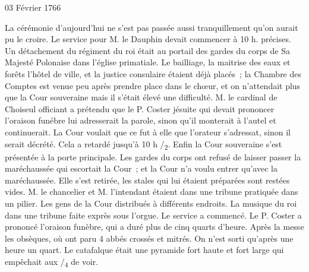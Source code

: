                     \begin{diary}{03 Février 1766}{}
                        
                         La cérémonie d'aujourd'hui ne s'est
                           pas
                           passée aussi tranquillement qu'on aurait pu
                           le croire. Le service pour M.
                              le Dauphin
                           devait commencer à 10 h. précises. Un
                           détachement du régiment du
                              roi était au portail
                           des gardes du corps de Sa Majesté Polonaise dans l’église
                              primatiale. Le
                              bailliage, la maitrise
                              des eaux et forêts
                           l'hôtel de ville, et la justice
                           consulaire étaient
                           déjà placés ; la Chambre des
                              Comptes est
                           venue peu après prendre place dans le
                           chœur, et on n'attendait plus que la Cour
                              souveraine mais il s'était élevé une difficulté.
                           M. le cardinal de Choiseul
                           officiant a prétendu
                           que le P. Coster
                           jésuite qui devait prononcer
                           l'oraison funébre lui adresserait la parole,
                           sinon qu'il monterait à l'autel et continuerait.
                           La Cour voulait que ce fut à elle que l'orateur
                           s'adressat, sinon il serait décrété. Cela
                           a retardé jusqu'à 10 h /\textsubscript{2}. Enfin la Cour souveraine
                           s'est présentée à la porte principale. Les
                           gardes du corps ont refusé de laisser passer
                           la maréchaussée qui escortait la Cour ; et la Cour n'a
                           voulu entrer qu'avec la maréchaussée. Elle s'est
                           retirée, les stales qui lui étaient préparées
                           sont restées vides. M. le
                              chancelier et M. l'intendant
                           étaient dans une tribune
                           pratiquée dans un pilier. Les gens de la
                           Cour distribués à différents endroits. La
                              musique du roi dans une tribune faite
                           exprès sous l'orgue. Le service a commencé.
                           Le P. Coster a prononcé l'oraison
                           funèbre, qui
                           a duré plus de cinq quarts d'heure. Après la
                           messe les obsèques, où ont paru 4 abbés
                           crossés et mitrés. On n'est sorti qu'après
                           une heure un quart. Le catafalque était
                           une pyramide fort haute et fort large
                           qui empêchait aux /\textsubscript{4}
                           de voir. \bigskip
        

\end{diary}

